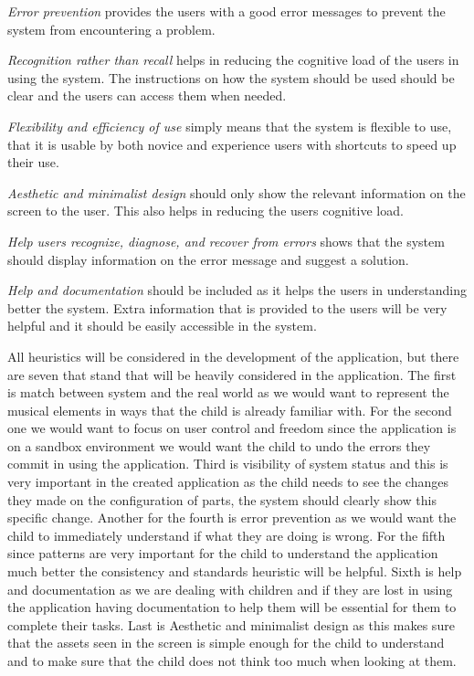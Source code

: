 \textit{Error prevention} provides the users with a good error messages to prevent the system from encountering a problem. 

\textit{Recognition rather than recall} helps in reducing the cognitive load of the users in using the system. The instructions on how the system should be used should be clear and the users can access them when needed.
 
\textit{Flexibility and efficiency of use} simply means that the system is flexible to use, that it is usable by both novice and experience users with shortcuts to speed up their use.

\textit{Aesthetic and minimalist design} should only show the relevant information on the screen to the user. This also helps in reducing the users cognitive load.

\textit{Help users recognize, diagnose, and recover from errors} shows that the system should display information on the error message and suggest a solution.

\textit{Help and documentation} should be included as it helps the users in understanding better the system. Extra information that is provided to the users will be very helpful and it should be easily accessible in the system.

All heuristics will be considered in the development of the application, but there are seven that stand that will be heavily considered in the application. The first is match  between  system  and  the  real  world as we would want to represent the musical elements in ways that the child is already familiar with. For the second one we would want to focus on user control and freedom since the application is on a sandbox environment we would want the child to undo the errors they commit in using the application. Third is visibility of system status and this is very important in the created application as the child needs to see the changes they made on the configuration of parts, the system should clearly show this specific change. Another for the fourth is error prevention as we would want the child to immediately understand if what they are doing is wrong. For the fifth since patterns are very important for the child to understand the application much better the consistency and standards heuristic will be helpful. Sixth is help and documentation as we are dealing with children and if they are lost in using the application having documentation to help them will be essential for them to complete their tasks. Last is Aesthetic and minimalist design as this makes sure that the assets seen in the screen is simple enough for the child to understand and to make sure that the child does not think too much when looking at them. 

